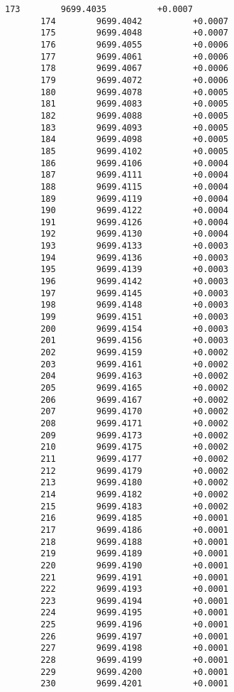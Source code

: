 \documentclass[11pt]{article}
\begin{document}
\begin{Verbatim}[commandchars=\\\{\}]
       173        9699.4035          +0.0007
       174        9699.4042          +0.0007
       175        9699.4048          +0.0007
       176        9699.4055          +0.0006
       177        9699.4061          +0.0006
       178        9699.4067          +0.0006
       179        9699.4072          +0.0006
       180        9699.4078          +0.0005
       181        9699.4083          +0.0005
       182        9699.4088          +0.0005
       183        9699.4093          +0.0005
       184        9699.4098          +0.0005
       185        9699.4102          +0.0005
       186        9699.4106          +0.0004
       187        9699.4111          +0.0004
       188        9699.4115          +0.0004
       189        9699.4119          +0.0004
       190        9699.4122          +0.0004
       191        9699.4126          +0.0004
       192        9699.4130          +0.0004
       193        9699.4133          +0.0003
       194        9699.4136          +0.0003
       195        9699.4139          +0.0003
       196        9699.4142          +0.0003
       197        9699.4145          +0.0003
       198        9699.4148          +0.0003
       199        9699.4151          +0.0003
       200        9699.4154          +0.0003
       201        9699.4156          +0.0003
       202        9699.4159          +0.0002
       203        9699.4161          +0.0002
       204        9699.4163          +0.0002
       205        9699.4165          +0.0002
       206        9699.4167          +0.0002
       207        9699.4170          +0.0002
       208        9699.4171          +0.0002
       209        9699.4173          +0.0002
       210        9699.4175          +0.0002
       211        9699.4177          +0.0002
       212        9699.4179          +0.0002
       213        9699.4180          +0.0002
       214        9699.4182          +0.0002
       215        9699.4183          +0.0002
       216        9699.4185          +0.0001
       217        9699.4186          +0.0001
       218        9699.4188          +0.0001
       219        9699.4189          +0.0001
       220        9699.4190          +0.0001
       221        9699.4191          +0.0001
       222        9699.4193          +0.0001
       223        9699.4194          +0.0001
       224        9699.4195          +0.0001
       225        9699.4196          +0.0001
       226        9699.4197          +0.0001
       227        9699.4198          +0.0001
       228        9699.4199          +0.0001
       229        9699.4200          +0.0001
       230        9699.4201          +0.0001

\end{Verbatim}
\end{document}

